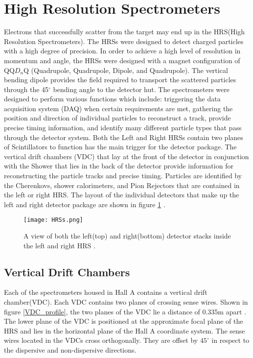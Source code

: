 \section{High Resolution Spectrometers}
Electrons that successfully scatter from the target may end up in the HRS(High Resolution Spectrometers). The HRSs were designed to detect charged particles with a high degree of precision. In order to achieve a high level of resolution in momentum and angle, the HRSs were designed with a magnet configuration of QQ$D_n$Q (Quadrupole, Quadrupole, Dipole, and Quadrupole). The vertical bending dipole provides the field required to transport the scattered particles through the 45$^\circ$ bending angle to the detector hut. The spectrometers were designed to perform various functions which include: triggering the data acquisition system (DAQ) when certain requirements are met, gathering the position and direction of individual particles to reconstruct a track, provide precise timing information, and identify many different particle types that pass through the detector system. Both the Left and Right HRSs contain two planes of Scintillators to function has the main trigger for the detector package. The vertical drift chambers (VDC) that lay at the front of the detector in conjunction with the Shower that lies in the back of the detector provide information for reconstructing the particle tracks and precise timing. Particles are identified by the Cherenkovs, shower calorimeters, and Pion Rejectors that are contained in the left or right HRS. The layout of the individual detectors that make up the left and right detector package are shown in figure \ref{hrsss}  \cite{HallA}.

\begin{figure}
\centering

\texttt{[image: HRSs.png]}

\caption{A view of both the left(top) and right(bottom) detector stacks inside the left and right HRS \cite{HallA}.
\label{hrsss}}
\end{figure}


	\subsection{Vertical Drift Chambers}
	Each of the spectrometers housed in Hall A contains a vertical drift chamber(VDC). Each VDC contains two planes of crossing sense wires. Shown in figure \ref{VDC_profile}, the two planes of the VDC lie a distance of 0.335m apart \cite{drift}. The lower plane of the VDC is positioned at the approximate focal plane of the HRS and lies in the horizontal plane of the Hall A coordinate system. The sense wires located in the VDCs cross orthogonally. They are offset by $45^\circ$ in respect to the dispersive and non-dispersive directions. 
	
